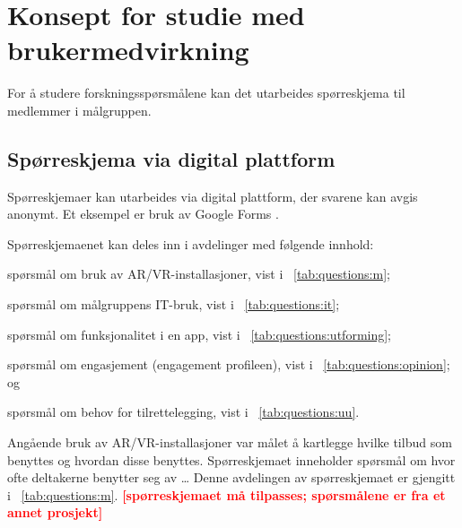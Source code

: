 \documentclass[11pt,english]{nik}
\newcommand{\ep}{engagement profile\xspace}
\newcommand{\WVL}[1]{\textbf{\textcolor{red}{#1}}}
\begin{document}

\section{Konsept for studie med brukermedvirkning}

For å studere forskningsspørsmålene kan det utarbeides spørreskjema til
medlemmer i målgruppen. 

\subsection{Spørreskjema via digital plattform}

Spørreskjemaer kan utarbeides via digital plattform, der svarene kan avgis anonymt.
Et eksempel er bruk av Google Forms \autocite{google-forms}.

Spørreskjemaenet kan deles inn i avdelinger med følgende innhold: 
\begin{enumerate*}[label={\alph*)},ref=\alph*]
\item spørsmål om bruk av AR/VR-installasjoner, vist i \tablename~\ref{tab:questions:m};
\item spørsmål om målgruppens IT-bruk, vist i \tablename~\ref{tab:questions:it};
\item spørsmål om funksjonalitet i en app, vist i \tablename~\ref{tab:questions:utforming};
\item spørsmål om engasjement (\ep{en}), vist i \tablename~\ref{tab:questions:opinion};
og
\item spørsmål om behov for tilrettelegging, vist i \tablename~\ref{tab:questions:uu}.
\end{enumerate*}


Angående bruk av AR/VR-installasjoner var målet å kartlegge hvilke tilbud
som benyttes og hvordan disse benyttes. Spørreskjemaet inneholder
spørsmål om hvor ofte deltakerne benytter seg av \dots
Denne avdelingen
av spørreskjemaet er gjengitt i \tablename~\ref{tab:questions:m}.
\WVL{[spørreskjemaet må tilpasses; spørsmålene er fra et annet prosjekt]}
\end{document}
